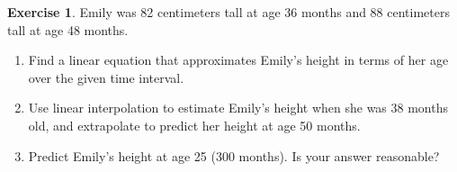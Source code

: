 \documentclass[10pt,]{book}
\theoremstyle{plain}
\theoremstyle{definition}
\theoremstyle{definition}
\theoremstyle{definition}
\theoremstyle{definition}
\newtheorem{exercise}[theorem]{Exercise}
\numberwithin{equation}{part}
\begin{document}
\begin{exercise}\label{exercise-Emily-height}
Emily was 82 centimeters tall at age 36 months and 88 centimeters tall at age 48 months. \leavevmode%
\begin{enumerate}[label=*\alph**]
\item\hypertarget{li-1324}{}Find a linear equation that approximates Emily's height in terms of her age over the given time interval.%
\item\hypertarget{li-1325}{}Use linear interpolation to estimate Emily’s height when she was 38 months old, and extrapolate to predict her height at age 50 months.%
\item\hypertarget{li-1326}{}Predict Emily's height at age 25 (300 months). Is your answer reasonable?%
\end{enumerate}
%
\end{exercise}
\end{document}
